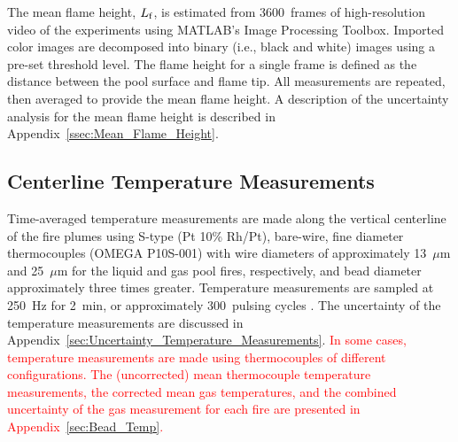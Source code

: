 \documentclass[12pt]{article}
\begin{document}
The mean flame height, $L_{\rm{f}}$, is estimated from 3600~frames of high-resolution video of the experiments using MATLAB’s Image Processing Toolbox. Imported color images are decomposed into binary (i.e., black and white) images using a pre-set threshold level. The flame height for a single frame is defined as the distance between the pool surface and flame tip. All measurements are repeated, then averaged to provide the mean flame height. A description of the uncertainty analysis for the mean flame height is described in Appendix~\ref{ssec:Mean_Flame_Height}.

\subsection{Centerline Temperature Measurements}
\label{ssec:Temperature_Measurements}

Time-averaged temperature measurements are made along the vertical centerline of the fire plumes using S-type (Pt 10\% Rh/Pt), bare-wire, fine diameter thermocouples (OMEGA P10S-001) with wire diameters of approximately 13~$\mu$m and 25~$\mu$m for the liquid and gas pool fires, respectively, and bead diameter approximately three times greater. Temperature measurements are sampled at \SI{250}{Hz} for \SI{2}{min}, or approximately 300~pulsing cycles \cite{Wang2019,Sung2021}. The uncertainty of the temperature measurements are discussed in Appendix~\ref{sec:Uncertainty_Temperature_Measurements}. \textcolor{red}{In some cases, temperature measurements are made using thermocouples of different configurations. The (uncorrected) mean thermocouple temperature measurements, the corrected mean gas temperatures, and the combined uncertainty of the gas measurement for each fire are presented in Appendix~\ref{sec:Bead_Temp}.}
\end{document}
